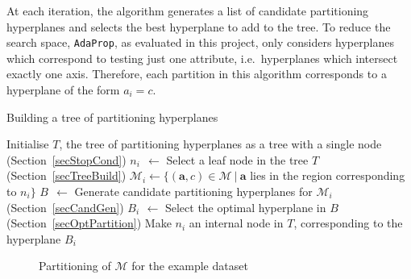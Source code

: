 \documentclass[a4paper,12pt]{report} %
\newcommand{\AdaProp}{\texttt{AdaProp}\xspace}
\newcommand{\mcl}[1]{\mathcal{#1}}
\newcommand{\vect}[1]{\boldsymbol{#1}}
\begin{document}
At each iteration,
    the algorithm generates a list of candidate partitioning hyperplanes and
    selects the best hyperplane to add to the tree.
To reduce the search space,
    \AdaProp, as evaluated in this project,
     only considers hyperplanes which
    correspond to testing just one attribute, 
    i.e.\ hyperplanes which intersect exactly one axis.
Therefore, each partition in this algorithm
    corresponds to a hyperplane of the form $a_i = c$.

\begin{algorithm}
\caption{Building a tree of partitioning hyperplanes}
\label{algoTree} 
\begin{algorithmic}
\State Initialise $T$, the tree of partitioning hyperplanes as a tree with a single node
 \hfill (Section~\ref{secStopCond})
    \State $n_i ~~\gets$ Select a leaf node in the tree $T$ \hfill (Section~\ref{secTreeBuild})
    \State $\mcl{M}_i \gets \{ (\vect{a},c) \in \mcl{M} ~|~ \vect{a}$ 
        lies in the region corresponding to $n_i \}$
    \State $B ~~\gets$ Generate candidate partitioning hyperplanes for 
        $\mcl{M}_i$ \hfill (Section~\ref{secCandGen})
    \State $B_i \,~\gets$ Select the optimal hyperplane in $B$ \hfill (Section~\ref{secOptPartition})
    \State Make $n_i$ an internal node in $T$, corresponding 
        to the hyperplane $B_i$
\EndWhile
\end{algorithmic}
\end{algorithm}

\begin{figure}
\begin{center}
\end{center}
\caption{Partitioning of $\mcl{M}$ for the example dataset}
\label{visMpart}
\end{figure}
\end{document}
